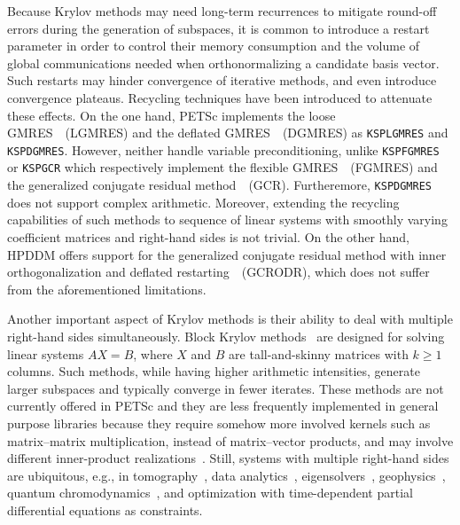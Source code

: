 \documentclass[3p,11pt]{elsarticle}
\newcommand{\pk}[1]{\texttt{#1}}
\begin{document}
Because Krylov methods may need long-term recurrences to mitigate round-off
errors during the generation of subspaces, it is common to introduce a
restart parameter in order to control their memory consumption and the volume of
global communications needed when orthonormalizing a candidate basis vector. Such
restarts may hinder convergence of iterative methods, and even introduce
convergence plateaus. Recycling techniques have been introduced to attenuate
these effects. On the one hand, PETSc implements the loose GMRES~\cite{baker2005technique}~(LGMRES) and the
deflated GMRES~\cite{erhel1996restarted,wakam2013158}~(DGMRES) as
\pk{KSPLGMRES} and \pk{KSPDGMRES}. However, neither handle variable
preconditioning, unlike \pk{KSPFGMRES} or \pk{KSPGCR} which respectively
implement the flexible GMRES~\cite{saad1993flexible}~(FGMRES) and the
generalized conjugate residual method~\cite{eisenstat1983variational}~(GCR).
Furtheremore, \pk{KSPDGMRES} does not support complex arithmetic.  Moreover,
extending the recycling capabilities of such methods to sequence of linear
systems with smoothly varying coefficient matrices and right-hand sides is not
trivial.  On the other hand, HPDDM offers support for the generalized conjugate
residual method with inner orthogonalization and deflated
restarting~\cite{parks2006recycling}~(GCRODR), which does not suffer from the
aforementioned limitations.

Another important aspect of Krylov methods is their ability
to deal with multiple right-hand sides simultaneously.
Block Krylov methods~\cite{gutknecht2006block} are
designed for solving linear systems $A X = B$, where
$X$ and $B$ are tall-and-skinny matrices with $k \geq 1$ columns.
Such methods, while having higher arithmetic
intensities, generate larger subspaces and typically converge in fewer iterates. These methods are not currently offered in PETSc and they are
less frequently implemented in general purpose libraries because they require
somehow more involved kernels such as matrix--matrix multiplication, instead of
matrix--vector products, and may involve different inner-product realizations~\cite{frommer2017block}.
Still, systems with multiple right-hand sides are ubiquitous,
e.g., in tomography~\cite{tournier2016micro}, data
analytics~\cite{KALANTZIS2018136}, eigensolvers~\cite{knyazev2001toward}, geophysics~\cite{calandra2012flexible}, quantum chromodynamics~\cite{sakurai2010application}, and optimization with time-dependent partial differential equations as constraints.
\end{document}
